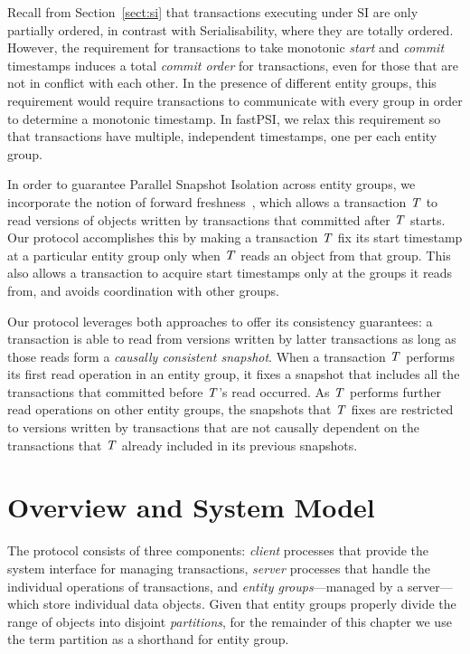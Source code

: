 Recall from Section~\ref{sect:si} that transactions executing under SI are only partially ordered, in contrast with Serialisability, where they are totally ordered. However, the requirement for transactions to take monotonic \emph{start} and \emph{commit} timestamps induces a total \emph{commit order} for transactions, even for those that are not in conflict with each other. In the presence of different entity groups, this requirement would require transactions to communicate with every group in order to determine a monotonic timestamp. In fastPSI, we relax this requirement so that transactions have multiple, independent timestamps, one per each entity group.

In order to guarantee Parallel Snapshot Isolation across entity groups, we incorporate the notion of forward freshness~\citep{ardekani_nmsi}, which allows a transaction $\mathit{T}$ to read versions of objects written by transactions that committed after $\mathit{T}$ starts. Our protocol accomplishes this by making a transaction $\mathit{T}$ fix its start timestamp at a particular entity group only when $\mathit{T}$ reads an object from that group. This also allows a transaction to acquire start timestamps only at the groups it reads from, and avoids coordination with other groups.

Our protocol leverages both approaches to offer its consistency guarantees: a transaction is able to read from versions written by latter transactions as long as those reads form a \emph{causally consistent snapshot}. When a transaction $\mathit{T}$ performs its first read operation in an entity group, it fixes a snapshot that includes all the transactions that committed before $\mathit{T}$'s read occurred. As $\mathit{T}$ performs further read operations on other entity groups, the snapshots that $\mathit{T}$ fixes are restricted to versions written by transactions that are not causally dependent on the transactions that $\mathit{T}$ already included in its previous snapshots.

\section{Overview and System Model}
\label{sect:protocol_overview}

The protocol consists of three components: \emph{client} processes that provide the system interface for managing transactions, \emph{server} processes that handle the individual operations of transactions, and \emph{entity groups}---managed by a server---which store individual data objects. Given that entity groups properly divide the range of objects into disjoint \emph{partitions}, for the remainder of this chapter we use the term partition as a shorthand for entity group.

